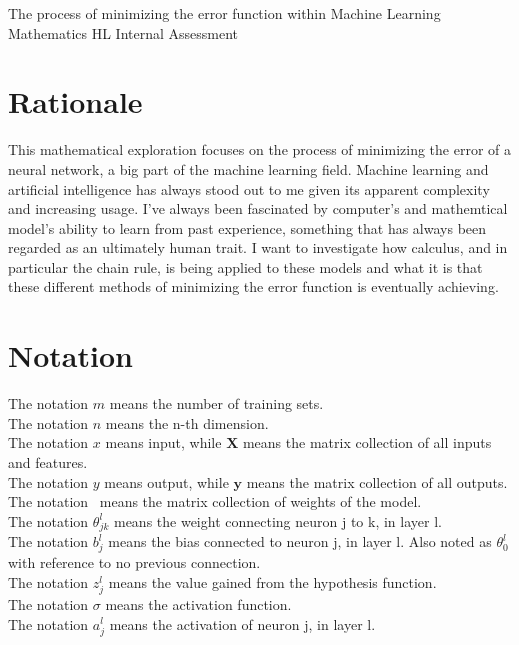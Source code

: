 \documentclass[a4paper,12pt]{article}
\begin{document}
\begin{center}
\Huge The process of minimizing the error function within Machine Learning \\
\small Mathematics HL Internal Assessment
\end{center}

\section{Rationale}
This mathematical exploration focuses on the process of minimizing the error of a neural network, a big part of the machine learning field. Machine learning and artificial intelligence has always stood out to me given its apparent complexity and increasing usage. I've always been fascinated by computer's and mathemtical model's ability to learn from past experience, something that has always been regarded as an ultimately human trait. I want to investigate how calculus, and in particular the chain rule, is being applied to these models and what it is that these different methods of minimizing the error function is eventually achieving. 

\section{Notation}
The notation \(m\) means the number of training sets. \\
The notation \(n\) means the n-th dimension.  \\
The notation $x$ means input, while $\boldsymbol{X}$ means the matrix collection of all inputs and features. \\
The notation $y$ means output, while $\boldsymbol{y}$ means the matrix collection of all outputs. \\
The notation \boldmath{$\Theta$}\unboldmath \ means the matrix collection of weights of the model. \\
The notation $\theta_{jk}^l$ means the weight connecting neuron j to k, in layer l. \\
The notation $b_j^l$ means the bias connected to neuron j, in layer l. Also noted as $\theta^l_0$ with reference to no previous connection.\\
The notation $z_j^l$ means the value gained from the hypothesis function. \\
The notation $\sigma$ means the activation function. \\
The notation $a^l_j$ means the activation of neuron j, in layer l. 
\end{document}
